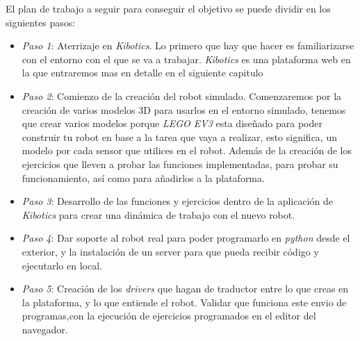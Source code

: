 El plan de trabajo a seguir para conseguir el objetivo se puede dividir en los siguientes pasos:
\begin{itemize}
    \item \textit{Paso 1}: Aterrizaje en \textit{Kibotics}. Lo primero que hay que hacer es familiarizarse con el entorno con el que se va a trabajar. \textit{Kibotics} es una plataforma web en la que entraremos mas en detalle en el siguiente capitulo 
    \item \textit{Paso 2}: Comienzo de la creación del robot simulado. Comenzaremos por la creación de varios modelos 3D para usarlos en el entorno simulado, tenemos que crear varios modelos porque \textit{LEGO EV3} esta diseñado para poder construir tu robot en base a la tarea que vaya a realizar, esto significa, un modelo por cada sensor que utilices en el robot. Además de la creación de los ejercicios que lleven a probar las funciones implementadas, para probar su funcionamiento, así como para añadirlos a la plataforma.
    \item \textit{Paso 3}: Desarrollo de las funciones y ejercicios dentro de la aplicación de \textit{Kibotics} para crear una dinámica de trabajo con el nuevo robot.
    \item \textit{Paso 4}: Dar soporte al robot real para poder programarlo en \textit{python} desde el exterior, y la instalación de un server para que pueda recibir código y ejecutarlo en local.\newline

    \item \textit{Paso 5}: Creación de los \textit{drivers} que hagan de traductor entre lo que creas en la plataforma, y lo que entiende el robot. Validar que funciona este envio de programas,con la ejecución de ejercicios programados en el editor del navegador.
\end{itemize}